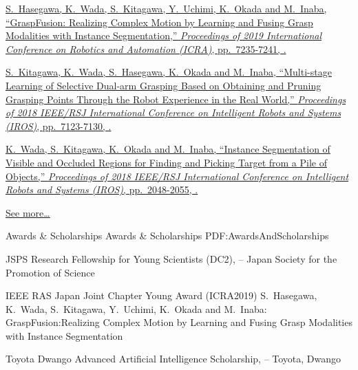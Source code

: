 \documentclass[letterpaper,MMMyyyy,nonstopmode]{simpleresumecv}
\begin{document}
\begin{Body}
\BulletItem
\href{https://doi.org/10.1109/ICRA.2019.8793710}
{S.~Hasegawa, K.~Wada, \underline{S.~Kitagawa}, Y.~Uchimi, K.~Okada and M.~Inaba,
``GraspFusion: Realizing Complex Motion by Learning and Fusing Grasp Modalities with Instance Segmentation,''
\textit{Proceedings of 2019 International Conference on Robotics and Automation (ICRA)},
pp.~7235-7241,
.}

\BulletItem
\href{https://doi.org/10.1109/IROS.2018.8593752}
{\underline{S.~Kitagawa}, K.~Wada, S.~Hasegawa, K.~Okada and M.~Inaba,
``Multi-stage Learning of Selective Dual-arm Grasping Based on Obtaining and Pruning Grasping Points Through the Robot Experience in the Real World,''
\textit{Proceedings of 2018 IEEE/RSJ International Conference on Intelligent Robots and Systems (IROS)},
pp.~7123-7130,
.}

\BulletItem
\href{https://doi.org/10.1109/IROS.2018.8593690}
{K.~Wada, \underline{S.~Kitagawa}, K.~Okada and M.~Inaba,
``Instance Segmentation of Visible and Occluded Regions for Finding and Picking Target from a Pile of Objects,''
\textit{Proceedings of 2018 IEEE/RSJ International Conference on Intelligent Robots and Systems (IROS)},
pp.~2048-2055,
.}

\hfill
\href{https://scholar.google.com/citations?user=deAeiIkAAAAJ}{\underline{See more…}}

\endgroup


\Section
{Awards \&\newline
Scholarships}
{Awards \& Scholarships}
{PDF:AwardsAndScholarships}

\BulletItem
JSPS Research Fellowship for Young Scientists (DC2),
\hfill
{} --
\newline
Japan Society for the Promotion of Science

 IEEE RAS Japan Joint Chapter Young Award (ICRA2019)
\hfill
{}
\newline
S.~Hasegawa, K.~Wada, S.~Kitagawa, Y.~Uchimi, K.~Okada and M.~Inaba:
GraspFusion:Realizing Complex Motion by Learning and Fusing Grasp Modalities with Instance Segmentation

\BulletItem
Toyota Dwango Advanced Artificial Intelligence Scholarship,
\hfill
{} --
\newline
Toyota, Dwango


\end{Body}
\end{document}
